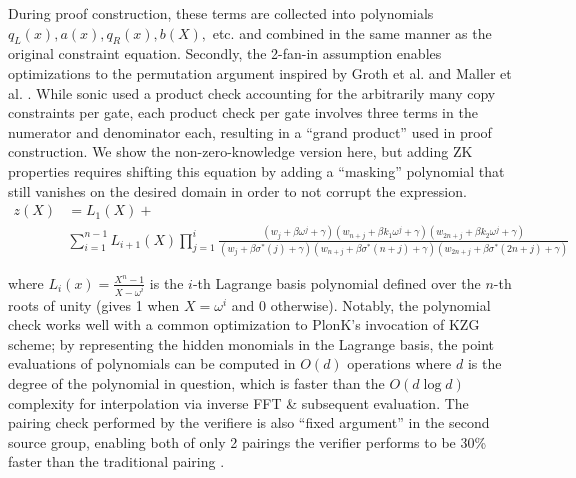 \noindent During proof construction, these terms are collected into polynomials $q_L(x), a(x), q_R(x), b(X),$ etc. and combined in the same manner as the original constraint equation. Secondly, the 2-fan-in assumption enables optimizations to the permutation argument inspired by Groth et al. and Maller et al. \cite{grothshuffle, sonic}. While sonic used a product check accounting for the arbitrarily many copy constraints per gate, each product check per gate involves three terms in the numerator and denominator each, resulting in a ``grand product'' used in proof construction. We show the non-zero-knowledge version here, but adding ZK properties requires shifting this equation by adding a ``masking'' polynomial that still vanishes on the desired domain in order to not corrupt the expression.
\begin{align}
    z(X) &= L_1(X) + \\
    &\sum_{i=1}^{n-1} L_{i+1}(X) \prod_{j=1}^{i} \frac{(w_j + \beta\omega^j + \gamma)(w_{n+j} + \beta k_1\omega^j + \gamma)(w_{2n+j} + \beta k_2\omega^j + \gamma)}{(w_j + \beta\sigma^*(j) + \gamma)(w_{n+j} + \beta\sigma^*(n+j) + \gamma)(w_{2n+j} + \beta\sigma^*(2n+j) + \gamma)}
\end{align}

\noindent where $L_i(x) = \frac{X^n - 1}{X - \omega^i}$ is the $i$-th Lagrange basis polynomial defined over the $n$-th roots of unity (gives 1 when $X = \omega^i$ and 0 otherwise). Notably, the polynomial check works well with a common optimization to PlonK's invocation of KZG scheme; by representing the hidden monomials in the Lagrange basis, the point evaluations of polynomials can be computed in $O(d)$ operations where $d$ is the degree of the polynomial in question, which is faster than the $O(d \log d)$ complexity for interpolation via inverse FFT \& subsequent evaluation. The pairing check performed by the verifiere is also ``fixed argument'' in the second source group, enabling both of only 2 pairings the verifier performs to be 30\% faster than the traditional pairing \cite{fapairings}.\\

